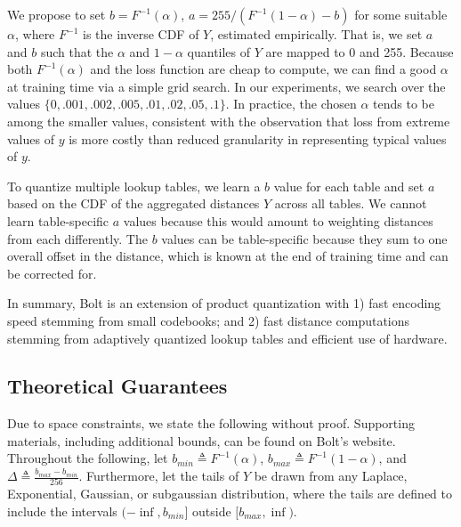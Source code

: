 We propose to set $b = F^{-1}(\alpha)$, $a = 255 / (F^{-1}(1 - \alpha) - b)$ for some suitable $\alpha$, where $F^{-1}$ is the inverse CDF of $Y$, estimated empirically. That is, we set $a$ and $b$ such that the $\alpha$ and $1 - \alpha$ quantiles of $Y$ are mapped to 0 and 255. Because both $F^{-1}(\alpha)$ and the loss function are cheap to compute, we can find a good $\alpha$ at training time via a simple grid search. In our experiments, we search over the values $\{0, .001, .002, .005, .01, .02, .05, .1\}$. In practice, the chosen $\alpha$ tends to be among the smaller values, consistent with the observation that loss from extreme values of $y$ is more costly than reduced granularity in representing typical values of $y$.

To quantize multiple lookup tables, we learn a $b$ value for each table and set $a$ based on the CDF of the aggregated distances $Y$ across all tables. We cannot learn table-specific $a$ values because this would amount to weighting distances from each differently. The $b$ values can be table-specific because they sum to one overall offset in the distance, which is known at the end of training time and can be corrected for.


In summary, Bolt is an extension of product quantization with 1) fast encoding speed stemming from small codebooks; and 2) fast distance computations stemming from adaptively quantized lookup tables and efficient use of hardware.

\subsection{Theoretical Guarantees}

Due to space constraints, we state the following without proof. Supporting materials, including additional bounds, can be found on Bolt's website. %
Throughout the following, let $b_{min} \triangleq F^{-1}(\alpha)$, $b_{max} \triangleq F^{-1}(1 - \alpha)$, and $\Delta \triangleq \frac{b_{max} - b_{min} }{ 256 }$. Furthermore, let the tails of $Y$ be drawn from any Laplace, Exponential, Gaussian, or subgaussian distribution, where the tails are defined to include the intervals $(-\inf, b_{min}]$ outside $[b_{max}, \inf)$.

